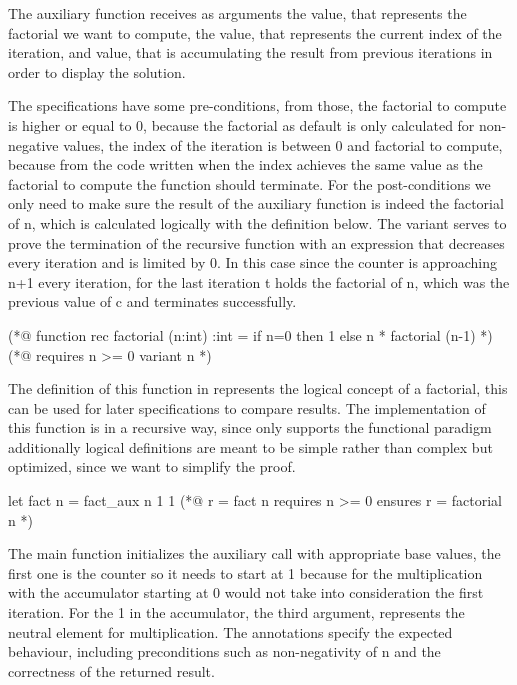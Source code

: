 The auxiliary function  receives as arguments the  value, that represents the factorial we want to 
compute, the  value, that represents the current index of the iteration, and  value, that is accumulating 
the result from previous iterations in order to display the solution.

The specifications have some pre-conditions, from those, the factorial to compute is higher or equal to 0, because the factorial as 
default is only calculated for non-negative values, the index of the iteration is between 0 and factorial to compute, because from the
code written when the index achieves the same value as the factorial to compute the function should terminate. For the post-conditions
we only need to make sure the result of the auxiliary function is indeed the factorial of n, which is calculated logically with the 
definition below. The variant serves to prove the termination of the recursive function with an expression that decreases every iteration
and is limited by 0. In this case since the counter is approaching n+1 every iteration, for the last iteration t holds the factorial of n,
which was the previous value of c and terminates successfully.

\begin{gospell}
(*@ 
  function rec factorial (n:int) :int = 
    if n=0 then 1 else n * factorial (n-1)
*)
(*@ 
  requires n >= 0
  variant n
*)
\end{gospell}

The definition of this function in \gospel represents the logical concept of a factorial, this can be used for later specifications 
to compare results. The implementation of this function is in a recursive way, since \gospel only supports the functional paradigm 
additionally logical definitions are meant to be simple rather than complex but optimized, since we want to simplify the proof.

\begin{gospell}
let fact n = fact_aux n 1 1
(*@ 
  r = fact n
  requires n >= 0 
  ensures r = factorial n
*)
\end{gospell}

The main function  initializes the auxiliary call with appropriate base values, the first one is the counter
so it needs to start at 1 because for the multiplication with the accumulator starting at 0 would not take into consideration the 
first iteration. For the 1 in the accumulator, the third argument, represents the neutral element for multiplication. The \gospel 
annotations specify the expected behaviour, including preconditions such as non-negativity of n and the correctness of the returned 
result. 

